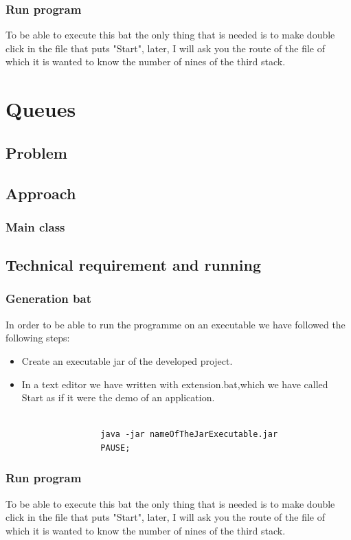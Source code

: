 \documentclass[a4paper]{article}
\theoremstyle{plain}
\theoremstyle{definition}
\begin{document}
        \subsubsection{Run program}
        To be able to execute this bat the only thing that is needed is to make double click in the file that puts "Start", later, I will ask you the route of the file of which it is wanted to know the number of nines of the third stack.
	
	
        
	\newpage
	\section{Queues}
	    \subsection{Problem}
	    \subsection{Approach}
	        \subsubsection{Main class}
	     \subsection{Technical requirement and running}
        \subsubsection{Generation bat}
        In order to be able to run the programme on an executable we have followed the following steps:
        \begin{itemize}
            \item Create an executable jar of the developed project. 
            \item In a text editor we have written with extension.bat,which we have called Start as if it were the demo of an application.
                \begin{verbatim}

                java -jar nameOfTheJarExecutable.jar
                PAUSE;

                \end{verbatim}
        \end{itemize}
        \subsubsection{Run program}
        To be able to execute this bat the only thing that is needed is to make double click in the file that puts "Start", later, I will ask you the route of the file of which it is wanted to know the number of nines of the third stack.
\newpage
\end{document}
